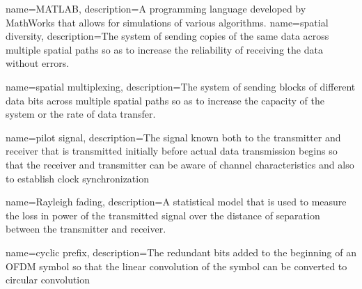 {
    name=MATLAB,
    description={A programming language developed by MathWorks that allows for simulations of various algorithms.}
}
{
	name=spatial diversity,
	description={The system of sending copies of the same data across multiple spatial paths so as to increase the reliability of receiving the data without errors.}
}

{
	name=spatial multiplexing,
	description={The system of sending blocks of different data bits across multiple spatial paths so as to increase the capacity of the system or the rate of data transfer.}
}

{
	name=pilot signal,
	description={The signal known both to the transmitter and receiver that is transmitted initially before actual data transmission begins so that the receiver and transmitter can be aware of channel characteristics and also to establish clock synchronization}
}

{
	name=Rayleigh fading,
	description={A statistical model that is used to measure the loss in power of the transmitted signal over the distance of separation between the transmitter and receiver.}
}

{
	name=cyclic prefix,
	description={The redundant bits added to the beginning of an OFDM symbol so that the linear convolution of the symbol can be converted to circular convolution}
}












